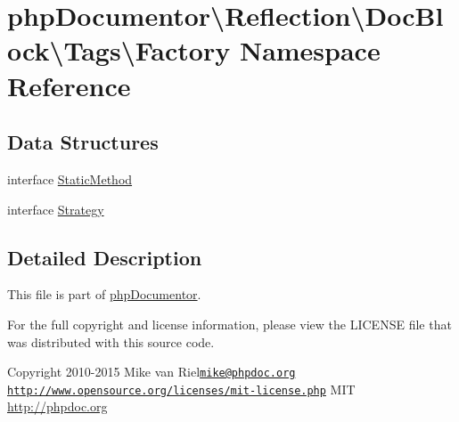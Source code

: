 \hypertarget{namespacephp_documentor_1_1_reflection_1_1_doc_block_1_1_tags_1_1_factory}{}\section{php\+Documentor\textbackslash{}Reflection\textbackslash{}Doc\+Block\textbackslash{}Tags\textbackslash{}Factory Namespace Reference}
\label{namespacephp_documentor_1_1_reflection_1_1_doc_block_1_1_tags_1_1_factory}
\subsection*{Data Structures}
\begin{DoxyCompactItemize}
\item 
interface \mbox{\hyperlink{interfacephp_documentor_1_1_reflection_1_1_doc_block_1_1_tags_1_1_factory_1_1_static_method}{Static\+Method}}
\item 
interface \mbox{\hyperlink{interfacephp_documentor_1_1_reflection_1_1_doc_block_1_1_tags_1_1_factory_1_1_strategy}{Strategy}}
\end{DoxyCompactItemize}


\subsection{Detailed Description}
This file is part of \mbox{\hyperlink{namespacephp_documentor}{php\+Documentor}}.

For the full copyright and license information, please view the L\+I\+C\+E\+N\+SE file that was distributed with this source code.

\begin{DoxyCopyright}{Copyright}
2010-\/2015 Mike van Riel\href{mailto:mike@phpdoc.org}{\tt mike@phpdoc.\+org}  \href{http://www.opensource.org/licenses/mit-license.php}{\tt http\+://www.\+opensource.\+org/licenses/mit-\/license.\+php} M\+IT \mbox{\hyperlink{}{http\+://phpdoc.\+org}}
\end{DoxyCopyright}

